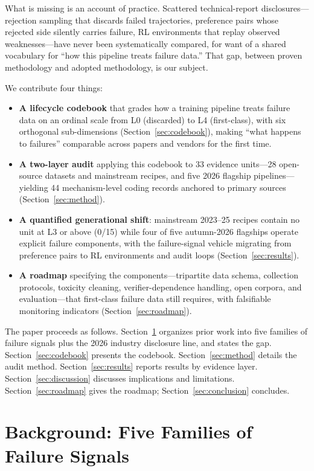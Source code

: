 \documentclass[10pt]{article}
\begin{document}
What is missing is an account of practice. Scattered technical-report disclosures---rejection sampling that discards failed trajectories, preference pairs whose rejected side silently carries failure, RL environments that replay observed weaknesses---have never been systematically compared, for want of a shared vocabulary for ``how this pipeline treats failure data.'' That gap, between proven methodology and adopted methodology, is our subject.

We contribute four things:

\begin{itemize}
\item \textbf{A lifecycle codebook} that grades how a training pipeline treats failure data on an ordinal scale from L0 (discarded) to L4 (first-class), with six orthogonal sub-dimensions (Section~\ref{sec:codebook}), making ``what happens to failures'' comparable across papers and vendors for the first time.
\item \textbf{A two-layer audit} applying this codebook to 33 evidence units---28 open-source datasets and mainstream recipes, and five 2026 flagship pipelines---yielding 44 mechanism-level coding records anchored to primary sources (Section~\ref{sec:method}).
\item \textbf{A quantified generational shift}: mainstream 2023--25 recipes contain no unit at L3 or above (0/15) while four of five autumn-2026 flagships operate explicit failure components, with the failure-signal vehicle migrating from preference pairs to RL environments and audit loops (Section~\ref{sec:results}).
\item \textbf{A roadmap} specifying the components---tripartite data schema, collection protocols, toxicity cleaning, verifier-dependence handling, open corpora, and evaluation---that first-class failure data still requires, with falsifiable monitoring indicators (Section~\ref{sec:roadmap}).
\end{itemize}

The paper proceeds as follows. Section~\ref{sec:background} organizes prior work into five families of failure signals plus the 2026 industry disclosure line, and states the gap. Section~\ref{sec:codebook} presents the codebook. Section~\ref{sec:method} details the audit method. Section~\ref{sec:results} reports results by evidence layer. Section~\ref{sec:discussion} discusses implications and limitations. Section~\ref{sec:roadmap} gives the roadmap; Section~\ref{sec:conclusion} concludes.

\section{Background: Five Families of Failure Signals}\label{sec:background}
\end{document}
